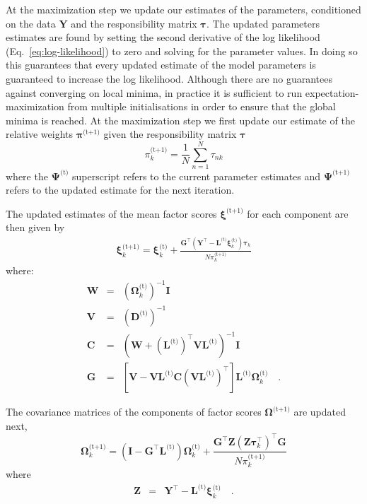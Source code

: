 \documentclass[twocolumn]{aastex62}
\newcommand{\vect}[1]{\boldsymbol{\mathbf{#1}}}
\renewcommand{\vec}[1]{\vect{#1}}
\newcommand{\weight}{\pi}
\newcommand{\data}{\textbf{Y}}
\newcommand{\vecdata}{\vec\data}
\newcommand{\nextstep}{^\textrm{(t+1)}}
\newcommand{\thisstep}{^\textrm{(t)}}
\newcommand{\transpose}{^\intercal}
\newcommand{\eye}{\textbf{I}}
\newcommand{\factorloads}{\textbf{L}}
\newcommand{\specificvariance}{\vec{D}}
\newcommand{\scoremeans}{\vec\xi}
\newcommand{\scorecovs}{\vec\Omega}
\newcommand{\NumData}{N}
\newcommand{\numdata}{n}
\newcommand{\numcomponents}{k}
\begin{document}
At the maximization step we update our estimates of the parameters,
conditioned on the data $\vecdata$ and the responsibility matrix $\vec\tau$.
The updated parameters estimates are found by setting the second derivative
of the log likelihood (Eq.~\ref{eq:log-likelihood}) to zero and solving for
the parameter values. In doing so this guarantees that every updated
estimate of the model parameters is guaranteed to increase the log likelihood.
Although there are no guarantees against converging on local minima, in 
practice it is sufficient to run expectation-maximization from multiple
initialisations in order to ensure that the global minima is reached.
At the maximization step we first update our estimate of the relative weights 
$\vec\weight\nextstep$ given the responsibility matrix $\vec\tau$
\begin{equation}
	\weight_\numcomponents\nextstep = \frac{1}{\NumData} \sum_{\numdata=1}^{\NumData}\tau_{\numdata\numcomponents}
\end{equation}
\noindent{}where the $\vec{\Psi}\thisstep$ superscript refers to the current parameter estimates and $\vec{\Psi}\nextstep$ refers to the updated estimate for the next iteration.


The updated estimates of the mean factor scores 
$\scoremeans\nextstep$ for each component are then given by
\begin{eqnarray}
	\scoremeans_\numcomponents\nextstep = \scoremeans_\numcomponents\thisstep + \frac{\vec{G}\transpose(\vecdata\transpose - \factorloads\thisstep\scoremeans_\numcomponents\thisstep)\vec\tau_\numcomponents}{\NumData\weight_\numcomponents\nextstep}
\end{eqnarray}
\noindent{}where:
\begin{eqnarray}
	\vec{W} &=& (\scorecovs_\numcomponents\thisstep)^{-1}\eye \\
	\vec{V} &=& \left(\specificvariance\thisstep\right)^{-1} \\
	\vec{C} &=& (\vec{W} + (\factorloads\thisstep)\transpose\vec{V}\factorloads\thisstep)^{-1}\eye \\
	\vec{G} &=& \left[\vec{V} - \vec{V}\factorloads\thisstep\vec{C}\left(\vec{V}\factorloads\thisstep\right)\transpose\right]\factorloads\thisstep\scorecovs_k\thisstep \quad .
\end{eqnarray}

The covariance matrices of the components of factor scores $\scorecovs\nextstep$
are updated next,
\begin{equation}
	\scorecovs_\numcomponents\nextstep = \left(\eye - \vec{G}\transpose\factorloads\thisstep\right)\scorecovs_\numcomponents\thisstep + \frac{\vec{G}\transpose\vec{Z}\left(\vec{Z}\vec\tau_\numcomponents\transpose\right)\transpose\vec{G}}{N\weight_\numcomponents\nextstep}
\end{equation}
\noindent{}where
\begin{eqnarray}
	\vec{Z} &=& \vecdata\transpose - \factorloads\thisstep\scoremeans_\numcomponents\thisstep \quad .
\end{eqnarray}
\end{document}
